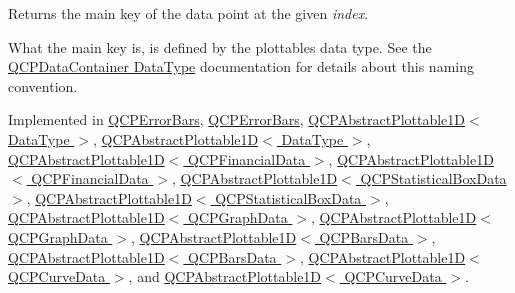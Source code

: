 Returns the main key of the data point at the given {\itshape index}.

What the main key is, is defined by the plottable\textquotesingle{}s data type. See the \hyperlink{class_q_c_p_data_container_qcpdatacontainer-datatype}{Q\+C\+P\+Data\+Container Data\+Type} documentation for details about this naming convention. 

Implemented in \hyperlink{class_q_c_p_error_bars_ae3931213f76cd34a824c42c22a1dca74}{Q\+C\+P\+Error\+Bars}, \hyperlink{class_q_c_p_error_bars_acdd5689cdb5562706111a55381fb9009}{Q\+C\+P\+Error\+Bars}, \hyperlink{class_q_c_p_abstract_plottable1_d_ab14ab428595856bf76e04499017fa8dc}{Q\+C\+P\+Abstract\+Plottable1\+D$<$ Data\+Type $>$}, \hyperlink{class_q_c_p_abstract_plottable1_d_aa996a79be21741bdea8284f0bb776ed1}{Q\+C\+P\+Abstract\+Plottable1\+D$<$ Data\+Type $>$}, \hyperlink{class_q_c_p_abstract_plottable1_d_ab14ab428595856bf76e04499017fa8dc}{Q\+C\+P\+Abstract\+Plottable1\+D$<$ Q\+C\+P\+Financial\+Data $>$}, \hyperlink{class_q_c_p_abstract_plottable1_d_aa996a79be21741bdea8284f0bb776ed1}{Q\+C\+P\+Abstract\+Plottable1\+D$<$ Q\+C\+P\+Financial\+Data $>$}, \hyperlink{class_q_c_p_abstract_plottable1_d_ab14ab428595856bf76e04499017fa8dc}{Q\+C\+P\+Abstract\+Plottable1\+D$<$ Q\+C\+P\+Statistical\+Box\+Data $>$}, \hyperlink{class_q_c_p_abstract_plottable1_d_aa996a79be21741bdea8284f0bb776ed1}{Q\+C\+P\+Abstract\+Plottable1\+D$<$ Q\+C\+P\+Statistical\+Box\+Data $>$}, \hyperlink{class_q_c_p_abstract_plottable1_d_ab14ab428595856bf76e04499017fa8dc}{Q\+C\+P\+Abstract\+Plottable1\+D$<$ Q\+C\+P\+Graph\+Data $>$}, \hyperlink{class_q_c_p_abstract_plottable1_d_aa996a79be21741bdea8284f0bb776ed1}{Q\+C\+P\+Abstract\+Plottable1\+D$<$ Q\+C\+P\+Graph\+Data $>$}, \hyperlink{class_q_c_p_abstract_plottable1_d_ab14ab428595856bf76e04499017fa8dc}{Q\+C\+P\+Abstract\+Plottable1\+D$<$ Q\+C\+P\+Bars\+Data $>$}, \hyperlink{class_q_c_p_abstract_plottable1_d_aa996a79be21741bdea8284f0bb776ed1}{Q\+C\+P\+Abstract\+Plottable1\+D$<$ Q\+C\+P\+Bars\+Data $>$}, \hyperlink{class_q_c_p_abstract_plottable1_d_ab14ab428595856bf76e04499017fa8dc}{Q\+C\+P\+Abstract\+Plottable1\+D$<$ Q\+C\+P\+Curve\+Data $>$}, and \hyperlink{class_q_c_p_abstract_plottable1_d_aa996a79be21741bdea8284f0bb776ed1}{Q\+C\+P\+Abstract\+Plottable1\+D$<$ Q\+C\+P\+Curve\+Data $>$}.

\mbox{\label{class_q_c_p_plottable_interface1_d_af6330919e8023277d08c958a6074fc76}} 
